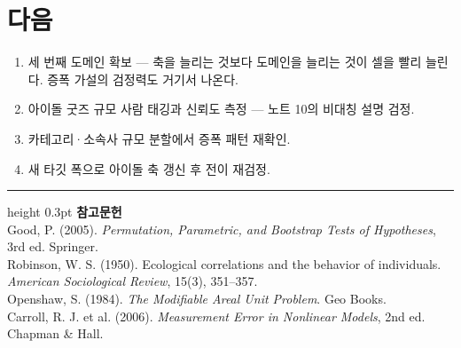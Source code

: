 \documentclass[10pt]{article}
\begin{document}
\section{다음}

\begin{enumerate}[leftmargin=1.3em,itemsep=0.15em]
\item 세 번째 도메인 확보 --- 축을 늘리는 것보다 도메인을 늘리는 것이 셀을 빨리
      늘린다. 증폭 가설의 검정력도 거기서 나온다.
\item 아이돌 굿즈 규모 사람 태깅과 신뢰도 측정 --- 노트 10의 비대칭 설명 검정.
\item 카테고리·소속사 규모 분할에서 증폭 패턴 재확인.
\item 새 타깃 폭으로 아이돌 축 갱신 후 전이 재검정.
\end{enumerate}

\vspace{0.6em}
\hrule height 0.3pt
\vspace{0.5em}
{\footnotesize
\textbf{참고문헌}\\[0.3em]
Good, P. (2005). \emph{Permutation, Parametric, and Bootstrap Tests of Hypotheses},
3rd ed. Springer.\\[0.15em]
Robinson, W. S. (1950). Ecological correlations and the behavior of individuals.
\emph{American Sociological Review}, 15(3), 351--357.\\[0.15em]
Openshaw, S. (1984). \emph{The Modifiable Areal Unit Problem}. Geo Books.\\[0.15em]
Carroll, R. J. et al. (2006). \emph{Measurement Error in Nonlinear Models},
2nd ed. Chapman \& Hall.
}
\end{document}
